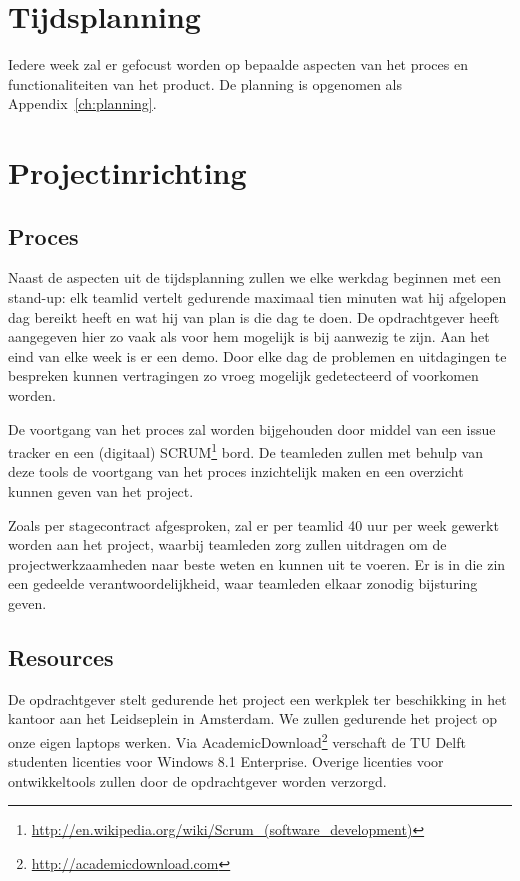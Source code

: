 \section{Tijdsplanning}
Iedere week zal er gefocust worden op bepaalde aspecten van het proces en functionaliteiten van het product. De planning is opgenomen als Appendix~\ref{ch:planning}.

\section{Projectinrichting}

\subsection{Proces}
Naast de aspecten uit de tijdsplanning zullen we elke werkdag beginnen met een stand-up: elk teamlid vertelt gedurende maximaal tien minuten wat hij afgelopen dag bereikt heeft en wat hij van plan is die dag te doen. De opdrachtgever heeft aangegeven hier zo vaak als voor hem mogelijk is bij aanwezig te zijn. Aan het eind van elke week is er een demo. Door elke dag de problemen en uitdagingen te bespreken kunnen vertragingen zo vroeg mogelijk gedetecteerd of voorkomen worden. 

De voortgang van het proces zal worden bijgehouden door middel van een issue tracker en een (digitaal) SCRUM\footnote{\url{http://en.wikipedia.org/wiki/Scrum_(software_development)}} bord. De teamleden zullen met behulp van deze tools de voortgang van het proces inzichtelijk maken en een overzicht kunnen geven van het project.

Zoals per stagecontract afgesproken, zal er per teamlid 40 uur per week gewerkt worden aan het project, waarbij teamleden zorg zullen uitdragen om de projectwerkzaamheden naar beste weten en kunnen uit te voeren. Er is in die zin een gedeelde verantwoordelijkheid, waar teamleden elkaar zonodig bijsturing geven. 

\subsection{Resources}
De opdrachtgever stelt gedurende het project een werkplek ter beschikking in het kantoor aan het Leidseplein in Amsterdam. We zullen gedurende het project op onze eigen laptops werken. Via AcademicDownload\footnote{\url{http://academicdownload.com}} verschaft de TU Delft studenten licenties voor Windows 8.1 Enterprise. Overige licenties voor ontwikkeltools zullen door de opdrachtgever worden verzorgd.

